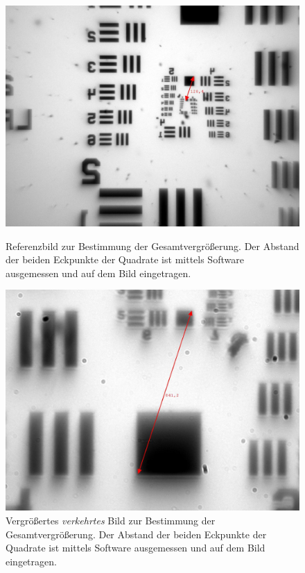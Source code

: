 \documentclass[ngerman]{scrartcl}
\begin{document}
\begin{figure}[H]
    \centering
    \begin{minipage}[t]{0.475\linewidth}
        \centering
        \includegraphics[width=\linewidth]{fig/Versuch3/hellfeld_4.1_referenz.jpg}
        \caption[Hellfeld Gesamtvergrößerung Referenz]{Referenzbild zur Bestimmung der Gesamtvergrößerung. Der Abstand der beiden Eckpunkte der Quadrate ist mittels Software ausgemessen und auf dem Bild eingetragen.}
        \label{fig:hellfeld_gesamtvergroeszerung_referenz}
    \end{minipage}%
    \hspace*{\fill}
    \begin{minipage}[t]{0.475\linewidth}
        \centering
        \includegraphics[width=\linewidth]{fig/Versuch3/hellfeld_4.1_vergroeszert.jpg}
        \caption[Hellfeld Gesamtvergrößerung vergrößert]{Vergrößertes \emph{verkehrtes} Bild zur Bestimmung der Gesamtvergrößerung. Der Abstand der beiden Eckpunkte der Quadrate ist mittels Software ausgemessen und auf dem Bild eingetragen.}
        \label{fig:hellfeld_gesamtvergroeszerung_vergroeszert}
    \end{minipage}
\end{figure}
\end{document}
